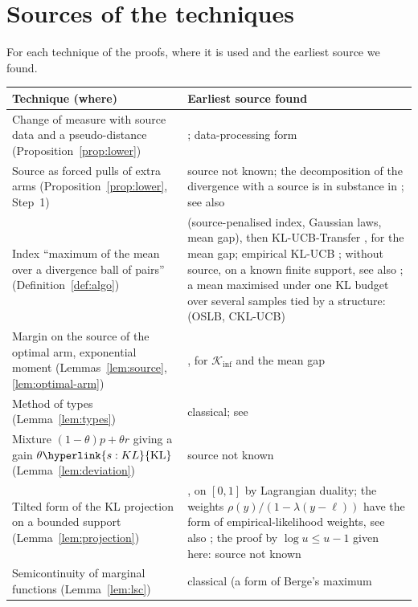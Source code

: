 \documentclass[11pt]{article}
\newcommand{\Kinf}{\mathcal{K}_{\inf}}
\newcommand{\sy}[2]{{\hyperlink{#1}{#2}}}
\newcommand{\KL}{\sy{s:KL}{\mathrm{KL}}}
\begin{document}
\section{Sources of the techniques}\label{sec:attribution}

For each technique of the proofs, where it is used and the earliest source we found.

\begin{center}
\small
\begin{tabular}{@{}p{}p{}@{}}
\toprule
\raggedright Technique (where) & \raggedright Earliest source found\tabularnewline
\midrule
\raggedright Change of measure with source data and a pseudo-distance (Proposition~\ref{prop:lower}) &
\citet[Theorem~3]{PMM25}; data-processing form \citet[(6), (11)]{GMS19}\tabularnewline
\raggedright Source as forced pulls of extra arms (Proposition~\ref{prop:lower}, Step~1) & \raggedright source not known; the
decomposition of the divergence with a source is in substance in \citet[Appendix~A]{PMM25}; see also
\citet[Theorem~2]{PMRM26}\tabularnewline
\raggedright Index ``maximum of the mean over a divergence ball of pairs'' (Definition~\ref{def:algo}) &
\citet[Section~5.2, (4)]{PMM25} (source-penalised index, Gaussian laws, mean gap), then
KL-UCB-Transfer \citep[Section~5.2]{PMRM26}, for the mean gap; empirical KL-UCB
\citep[Section~5]{CGMMS13}; without source, on a known finite support, see also \citet{BK96}; a mean
maximised under one KL budget over several samples tied by a structure: \citet[Section~4.1]{MCP14}
(OSLB, CKL-UCB)\tabularnewline
\raggedright Margin on the source of the optimal arm, exponential moment (Lemmas~\ref{lem:source},
\ref{lem:optimal-arm}) & \raggedright \citet[Lemma~17]{PMRM26}, for $\Kinf$ and the mean gap\tabularnewline
\raggedright Method of types (Lemma~\ref{lem:types}) & \raggedright classical; see \citet{CK11}\tabularnewline
\raggedright Mixture $(1-\theta)p+\theta r$ giving a gain $\theta\KL$ (Lemma~\ref{lem:deviation}) & \raggedright source not
known\tabularnewline
\raggedright Tilted form of the KL projection on a bounded support (Lemma~\ref{lem:projection}) &
\citet[Theorems~5 and~8, proof of Theorem~8]{HT10}, on $[0,1]$ by Lagrangian duality; the weights
$\rho(y)/(1-\lambda(y-\ell))$ have the form of empirical-likelihood weights, see also \citet{O88};
the proof by $\log u\le u-1$ given here: source not known\tabularnewline
\raggedright Semicontinuity of marginal functions (Lemma~\ref{lem:lsc}) & \raggedright classical (a form of Berge's maximum

\end{tabular}
\end{center}
\end{document}
